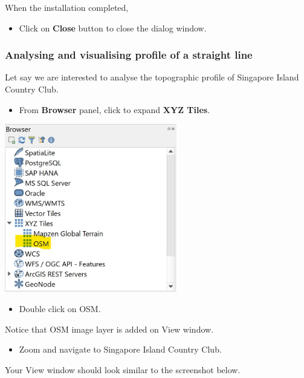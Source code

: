 \documentclass[
  letterpaper,
  DIV=11,
  numbers=noendperiod]{scrreprt}
\providecommand{\tightlist}{%
  \setlength{\itemsep}{0pt}\setlength{\parskip}{0pt}}\usepackage{longtable,booktabs,array}
\begin{document}
When the installation completed,

\begin{itemize}
\tightlist
\item
  Click on \textbf{Close} button to close the dialog window.
\end{itemize}

\hypertarget{analysing-and-visualising-profile-of-a-straight-line}{%
\subsubsection{Analysing and visualising profile of a straight
line}\label{analysing-and-visualising-profile-of-a-straight-line}}

Let say we are interested to analyse the topographic profile of
Singapore Island Country Club.

\begin{itemize}
\tightlist
\item
  From \textbf{Browser} panel, click to expand \textbf{XYZ Tiles}.
\end{itemize}

\includegraphics[width=2.95833in,height=\textheight]{./img06/image68.jpg}

\begin{itemize}
\tightlist
\item
  Double click on OSM.
\end{itemize}

Notice that OSM image layer is added on View window.

\begin{itemize}
\tightlist
\item
  Zoom and navigate to Singapore Island Country Club.
\end{itemize}

Your View window should look similar to the screenshot below.
\end{document}
